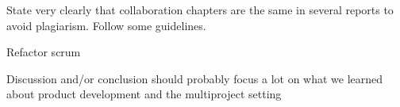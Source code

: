 State very clearly that collaboration chapters are the same in several reports to avoid plagiarism. Follow some guidelines.

Refactor scrum

Discussion and/or conclusion should probably focus a lot on what we learned about product development and the multiproject setting